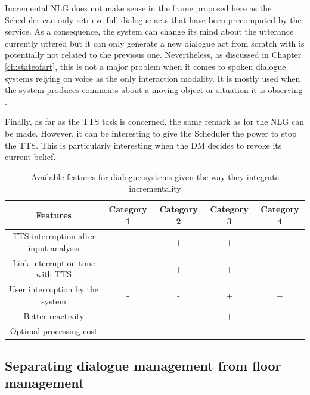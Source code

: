              Incremental NLG does not make sense in the frame proposed here as the Scheduler can only retrieve full dialogue acts that have been precomputed by the service. As a consequence, the system can change its mind about the utterance currently uttered but it can only generate a new dialogue act from scratch with is potentially not related to the previous one. Nevertheless, as discussed in Chapter \ref{ch:stateofart}, this is not a major problem when it comes to spoken dialogue systems relying on voice as the only interaction modality. It is mostly used when the system produces comments about a moving object or situation it is observing \cite{Baumann2013}.

             Finally, as far as the TTS task is concerned, the same remark as for the NLG can be made. However, it can be interesting to give the Scheduler the power to stop the TTS. This is particularly interesting when the DM decides to revoke its current belief.

             \begin{table}[!ht]
      	     \footnotesize
             \centering
             \begin{tabular}{|c|c|c|c|c|}
               \hline
               \textbf{Features}	& \textbf{Category 1} & \textbf{Category 2} & \textbf{Category 3} & \textbf{Category 4} \\
               \hline
               TTS interruption after input analysis & - & + & + & + \\
               \hline
               Link interruption time with TTS & - & + & + & + \\
               \hline
               User interruption by the system & - & - & + & + \\
               \hline
               Better reactivity & - & - & + & + \\
               \hline
               Optimal processing cost & - & - & - & + \\
               \hline
             \end{tabular}
             \caption{Available features for dialogue systems given the way they integrate incrementality}
             \label{tab:incrclassif}
             \end{table}
    
    \subsection{Separating dialogue management from floor management}
    
